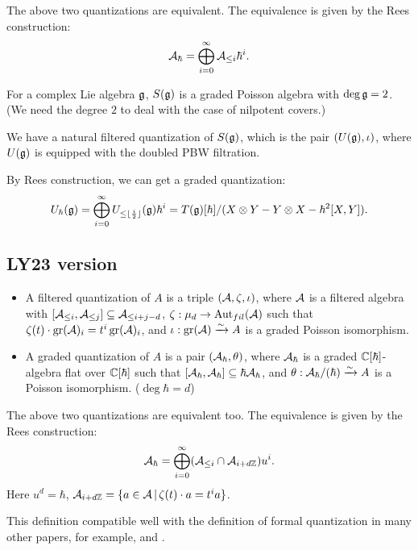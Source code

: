The above two quantizations are equivalent. The equivalence is given by the Rees construction:
\[\mathcal{A}_{\hbar} = \bigoplus_{i=0}^{\infty} \mathcal{A}_{\leq i} \hbar^i.\]

\begin{examp}
  For a complex Lie algebra $\mathfrak{g}$, $S(\mathfrak{g})$ is a graded Poisson algebra with $\deg \mathfrak{g} = 2$. (We need the degree $2$ to deal with the case of nilpotent covers.) 

  We have a natural filtered quantization of $S(\mathfrak{g})$, which is the pair $(U(\mathfrak{g}), \iota)$, where $U(\mathfrak{g})$ is equipped with the doubled PBW filtration.

  By Rees construction, we can get a graded quantization:
  \[
    U_{\hbar}(\mathfrak{g}) = \bigoplus_{i=0}^{\infty} U_{\leq \lfloor \frac{i}{2} \rfloor }(\mathfrak{g}) \hbar^i = T(\mathfrak{g})[\hbar]/(X \otimes Y - Y \otimes X - \hbar^2 [X,Y]).
  \]
\end{examp}

\subsection{LY23 version}
\cite[Section 2]{LY25}

\begin{itemize}
  \item A filtered quantization of $A$ is a triple $(\mathcal{A},\zeta,\iota)$, where $\mathcal{A}$ is a filtered algebra with $[\mathcal{A}_{\leq i},\mathcal{A}_{\leq j}] \subseteq \mathcal{A}_{\leq i+j-d}$, $\zeta: \mu_d \to \operatorname{Aut}_{fil}(\mathcal{A})$ such that $\zeta(t)\cdot \operatorname{gr}(\mathcal{A})_i = t^i \operatorname{gr}(\mathcal{A})_i$, and $\iota: \operatorname{gr}(\mathcal{A}) \xrightarrow{\sim} A$ is a graded Poisson isomorphism.
  \item A graded quantization of $A$ is a pair $(\mathcal{A}_{\hbar}, \theta)$, where $\mathcal{A}_{\hbar}$ is a graded $\mathbb{C}[\hbar]$-algebra flat over $\mathbb{C}[\hbar]$ such that $[\mathcal{A}_{\hbar},\mathcal{A}_{\hbar}] \subseteq \hbar\mathcal{A}_{\hbar}$, and $\theta: \mathcal{A}_{\hbar}/(\hbar) \xrightarrow{\sim} A$ is a Poisson isomorphism. ($\deg \hbar = d$)
\end{itemize}

The above two quantizations are equivalent too. The equivalence is given by the Rees construction:
\[\mathcal{A}_{\hbar} = \bigoplus_{i=0}^{\infty} (\mathcal{A}_{\leq i} \cap \mathcal{A}_{i + d \mathbb{Z}} ) u^i.\]
Here $u^d = \hbar$, $\mathcal{A}_{i+d\mathbb{Z}} = \{a \in \mathcal{A}\,|\,\zeta(t) \cdot a = t^i a\}$.

This definition compatible well with the definition of formal quantization in many other papers, for example, \cite{BK04} and \cite{LY21}.

